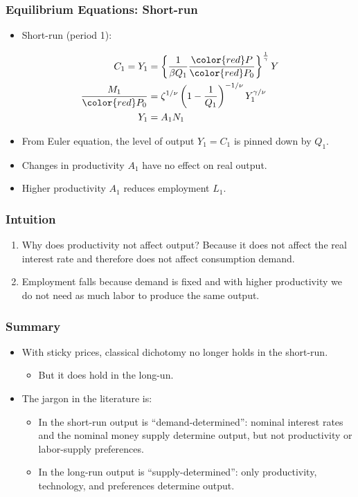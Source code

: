 \documentclass[english,xcolor=svgnames]{beamer}
\begin{document}
\begin{frame}
\frametitle{Equilibrium Equations: Short-run}
\begin{itemize}
	\item Short-run (period 1):
\end{itemize}
\begin{align*}
	C_1 = Y_1&= \left\{ \frac{1}{\beta Q_1} \frac{\color{red} P}{\color{red} P_0} \right\}^{\frac{1}{\gamma}} Y \\
	\frac{M_1}{\color{red} P_0}&=\zeta^{1/\nu}\left(1-\frac{1}{Q_1}\right)^{-1/\nu}Y_{1}^{\gamma/\nu}\\
	Y_1&=A_1N_{1}  
\end{align*}
\begin{itemize}
	\item From Euler equation, the level of output $Y_1 = C_1$ is pinned down by $Q_1$.
	\item Changes in productivity $A_1$ have no effect on real output.
	\item Higher productivity $A_1$ reduces employment $L_1$.
\end{itemize}
\end{frame}

\begin{frame}
\frametitle{Intuition
}
\begin{enumerate}[3.]
	\item Why does productivity not affect output? Because it does not affect the real interest rate and therefore does not affect consumption demand.
	\item Employment falls because demand is fixed and with higher productivity we do not need as much labor to produce the same output.
\end{enumerate}
\end{frame}


\begin{frame}
\frametitle{Summary
}
\begin{itemize}
	\item With sticky prices, classical dichotomy no longer holds in the short-run.
	\begin{itemize}
		\item But it does hold in the long-un.
	\end{itemize}
	\item The jargon in the literature is:
	\begin{itemize}
	\item In the short-run output is ``demand-determined'': nominal interest rates and the nominal money supply determine output, but not productivity or labor-supply preferences.
	\item In the long-run output is ``supply-determined'': only productivity, technology, and preferences determine output.
	\end{itemize}
\end{itemize}

\end{frame}
\end{document}
